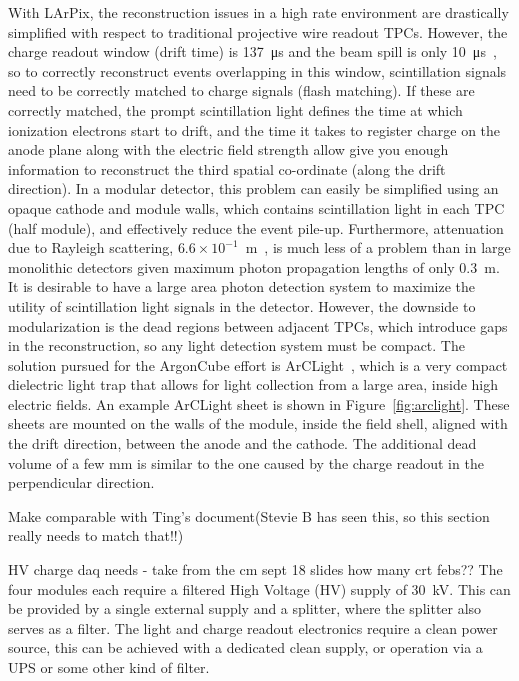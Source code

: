 With LArPix, the reconstruction issues in a high rate environment are drastically simplified with respect to traditional projective wire readout TPCs. However, the charge readout window (drift time) is \SI{137}{\micro\second} and the beam spill is only \SI{10}{\micro\second}~\cite{numi}, so to correctly reconstruct events overlapping in this window, scintillation signals need to be correctly matched to charge signals (flash matching). If these are correctly matched, the prompt scintillation light defines the time at which ionization electrons start to drift, and the time it takes to register charge on the anode plane along with the electric field strength allow give you enough information to reconstruct the third spatial co-ordinate (along the drift direction). In a modular detector, this problem can easily be simplified using an opaque cathode and module walls, which contains scintillation light in each TPC (half module), and effectively reduce the event pile-up. Furthermore, attenuation due to Rayleigh scattering, $6.6\times10^{-1}$~m~\cite{Rayleigh}, is much less of a problem than in large monolithic detectors given maximum photon propagation lengths of only \SI{0.3}{\metre}. It is desirable to have a large area photon detection system to maximize the utility of scintillation light signals in the detector. However, the downside to modularization is the dead regions between adjacent TPCs, which introduce gaps in the reconstruction, so any light detection system must be compact. The solution pursued for the ArgonCube effort is ArCLight~\cite{arclight}, which is a very compact dielectric light trap that allows for light collection from a large area, inside high electric fields. An example ArCLight sheet is shown in Figure~\ref{fig:arclight}. These sheets are mounted on the walls of the module, inside the field shell, aligned with the drift direction, between the anode and the cathode. The additional dead volume of a few \si{\milli\metre} is similar to the one caused by the charge readout in the perpendicular direction.


Make comparable with Ting's document(Stevie B has seen this, so this section really needs to match that!!)


HV
charge daq needs - take from the cm sept 18 slides  
how many crt febs??
The four modules each require a filtered High Voltage (HV) supply of \SI{30}{\kilo\volt}. This can be provided by a single external supply and a splitter, where the splitter also serves as a filter.
The light and charge readout electronics require a clean power source, this can be achieved with a dedicated clean supply, or operation via a UPS or some other kind of filter. 




